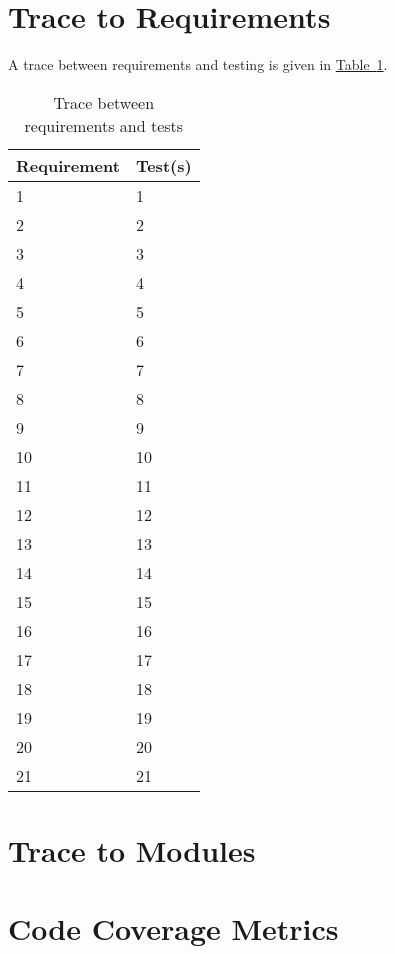 \documentclass[12pt, titlepage]{article}
\begin{document}
\section{Trace to Requirements}
A trace between requirements and testing is given in \hyperref[tab:tracereq]{Table~\ref*{tab:tracereq}}.\\

\begin{table}[h]
\caption{Trace between requirements and tests} \label{tab:tracereq}
\centering
\begin{tabularx}{0.55\textwidth}{p{4cm}X}
\toprule {\bf Requirement} & {\bf Test(s)}\\
\midrule
1	&	1	\\
2	&	2	\\
3	&	3	\\
4	&	4	\\
5	&	5	\\
6	&	6	\\
7	&	7	\\
8	&	8	\\
9	&	9	\\
10	&	10	\\
11	&	11	\\
12	&	12	\\
13	&	13	\\
14	&	14	\\
15	&	15	\\
16	&	16	\\
17	&	17	\\
18	&	18	\\
19	&	19	\\
20	&	20	\\
21	&	21	\\
\bottomrule
\end{tabularx}
\end{table}		

\section{Trace to Modules}		

\section{Code Coverage Metrics}




\end{document}
